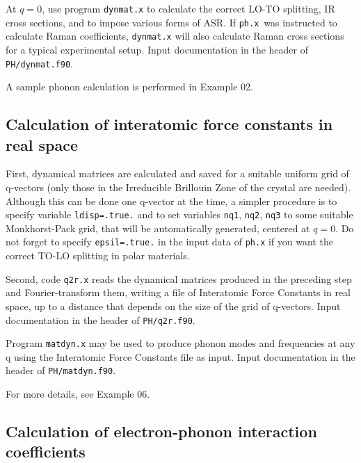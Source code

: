 \documentclass[12pt,a4paper]{article}
\def\ph.x{\texttt{ph.x}}
\begin{document}
At $q=0$, use program \texttt{dynmat.x} to calculate the correct LO-TO 
splitting, IR cross sections, and to impose various forms of ASR. 
If \ph.x\ was instructed to calculate Raman coefficients, 
\texttt{dynmat.x} will also calculate Raman cross sections
for a typical experimental setup.
Input documentation in the header of \texttt{PH/dynmat.f90}.

A sample phonon calculation is performed in Example 02.

\subsection{Calculation of interatomic force constants in real space}

First, dynamical matrices are calculated and saved for a suitable uniform 
grid of q-vectors (only those in the Irreducible Brillouin Zone of the
crystal are needed). Although this can be done one q-vector at the time, a
simpler procedure is to specify variable \texttt{ldisp=.true.} and to set 
variables \texttt{nq1}, \texttt{nq2}, \texttt{nq3} to some suitable 
Monkhorst-Pack grid, that will be automatically generated, centered at $q=0$. 
Do not forget to specify \texttt{epsil=.true.} in the input data of \ph.x 
if you want the correct TO-LO splitting in polar
materials.
    
Second, code \texttt{q2r.x} reads the dynamical matrices produced in the
preceding step and Fourier-transform them, writing a file of Interatomic Force
Constants in real space, up to a distance that depends on the size of the grid
of q-vectors. Input documentation in the header of \texttt{PH/q2r.f90}.

Program \texttt{matdyn.x} may be used to produce phonon modes and
frequencies at any q using the Interatomic Force Constants file as input.
Input documentation in the header of \texttt{PH/matdyn.f90}.

For more details, see Example 06.

\subsection{Calculation of electron-phonon interaction coefficients}
\end{document}
